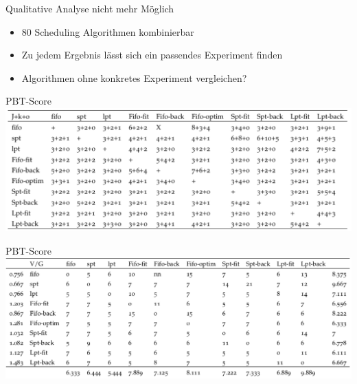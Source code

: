 \documentclass[aspectratio=169,10pt]{beamer}
\begin{document}
\begin{frame}[t,fragile]{Qualitative Analyse nicht mehr M\"oglich}
	\begin{itemize}[<+->]
		\item 80 Scheduling Algorithmen kombinierbar
		\item Zu jedem Ergebnis l\"asst sich ein passendes Experiment finden
		\item Algorithmen ohne konkretes Experiment vergleichen?
	\end{itemize}
\end{frame}

\begin{frame}[fragile]{PBT-Score}
		\vspace{0.5pt}
		\includegraphics[width=\linewidth, clip]{images/SchedulerX.png}
\end{frame}
\begin{frame}[fragile]{PBT-Score}
\vspace{0.5pt}
\includegraphics[width=\linewidth, clip]{images/SchedulerXScore.png}
\end{frame}
\end{document}
